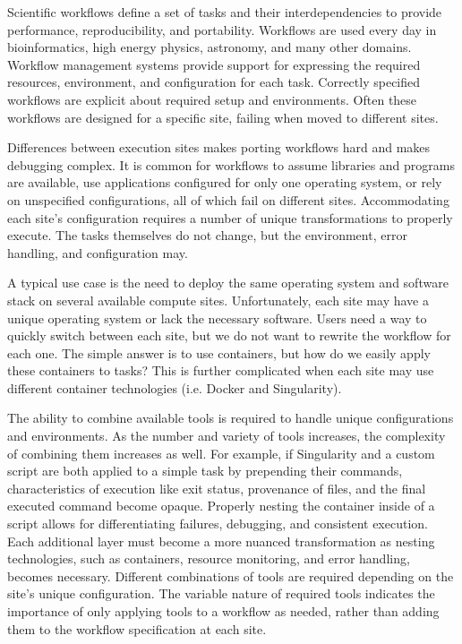 \documentclass[conference]{IEEEtran}
\begin{document}

Scientific workflows define a set of tasks 
and their interdependencies to provide
performance, reproducibility, and portability.
Workflows are used every day in 
bioinformatics\cite{pmid20080505, pmid2231712, makeflow-examples, giardine2005galaxy, blankenberg2010galaxy, goecks2010galaxy}, 
high energy physics\cite{10.1007/978-3-540-24669-5_107, lobster-cluster-2015}, 
astronomy\cite{10.1007/978-3-540-28642-4_2}, 
and many other domains.
Workflow management systems provide support for 
expressing the required resources,
environment, and configuration for each task.
Correctly specified workflows are explicit
about required setup and environments.
Often these workflows are designed for a 
specific site, failing when
moved to different sites.


Differences between execution sites
makes porting workflows hard 
and makes debugging complex. 
It is common for workflows to
assume libraries and programs are available, 
use  applications configured for only one operating system,
or rely on unspecified configurations,
all of which fail on different sites.
Accommodating each site's configuration
requires a number of unique transformations to properly execute.
The tasks themselves do not change,
but the environment, error handling, and configuration 
may.


A typical use case is the 
need to deploy the same operating system and
software stack on several available
compute sites.
Unfortunately, each site may have a unique
operating system or lack the necessary software.
Users need a way to quickly switch between
each site, but we do not want to rewrite the 
workflow for each one.
The simple answer is to use containers,
but how do we easily apply these containers 
to tasks?
This is further complicated when each site
may use different container technologies
(i.e. Docker\cite{Merkel:2014:DLL:2600239.2600241}
and Singularity\cite{Singularity}).

The ability to combine available tools is required
to handle unique configurations and environments.
As the number and variety of tools increases, 
the complexity of combining them increases as well.
For example, if 
Singularity and a custom script
are both applied to a simple task by prepending their
commands, characteristics of execution like
exit status, provenance of files, and
the final executed command become opaque.
Properly nesting the container inside of a
script allows for differentiating failures, 
debugging, and consistent execution.
Each additional layer must become a more nuanced transformation
as nesting technologies, 
such as containers,
resource monitoring, 
and error handling,
becomes necessary.
Different combinations of tools are required
depending on the site's unique configuration.
The variable nature of required tools indicates
the importance of only applying tools to a workflow as needed, 
rather than adding them to the workflow specification at each site.
\end{document}
